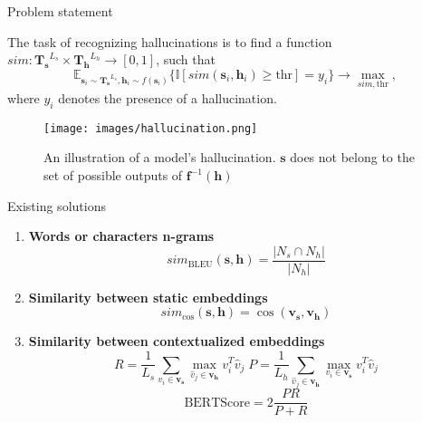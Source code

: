 \documentclass{beamer}
\begin{document}
\begin{frame}{Problem statement}

The task of recognizing hallucinations is to find a function $sim: \mathbf{T_s}^{L_s} \times \mathbf{T_h}^{L_h} \to [0, 1]$, such that
\[\mathbb{E}_{\mathbf{s}_i \sim \mathbf{T_s}^{L_s}, \mathbf{h}_i \sim f(\mathbf{s}_i)} \{\mathbb{I}[sim(\mathbf{s}_i, \mathbf{h}_i) \ge \text{thr}] = y_i \} \to \max\limits_{sim, \text{thr}},\]
where $y_i$ denotes the presence of a hallucination.

\begin{figure}
    \texttt{[image: images/hallucination.png]}
    \caption{An illustration of a model's hallucination. $\mathbf{s}$ does not belong to the set of possible outputs of $\mathbf{f}^{-1}(\mathbf{h})$}
    \label{fig:hal}
\end{figure}


\end{frame}

\begin{frame}{Existing solutions}

\begin{enumerate}
    \item \textbf{Words or characters n-grams} \[sim_\text{BLEU}(\mathbf{s}, \mathbf{h}) = \frac{|N_{s} \cap N_{h}|}{|N_{h}|}\]
    \item \textbf{Similarity between static embeddings} \[sim_\text{cos}(\mathbf{s}, \mathbf{h}) = \cos (\mathbf{v_s}, \mathbf{v_h})\]
    \item \textbf{Similarity between contextualized embeddings} \[R = \dfrac{1}{L_s} \sum\limits_{v_i \in \mathbf{v_s}} \max\limits_{\hat{v}_j \in \mathbf{v_h}} v^T_i \hat{v}_j \; P = \dfrac{1}{L_h} \sum\limits_{\hat{v}_j \in \mathbf{v_h}} \max\limits_{v_i \in \mathbf{v_s}} v^T_i \hat{v}_j \] 
    \[\text{BERTScore} = 2\dfrac{P R}{P + R}\]
\end{enumerate}

\end{frame}
\end{document}
